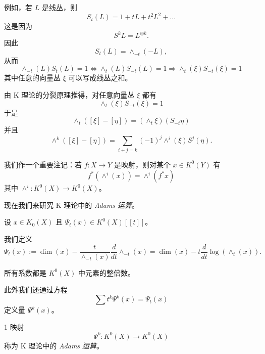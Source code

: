 例如，若 $L$ 是线丛，则
\[ S_t(L) = 1+tL+t^2L^2+\ldots \]
这是因为
\[ S^kL = L^{\otimes k}. \]
因此
\[ S_t(L) = \wedge_{-t}(-L), \]
从而
\[ \wedge_{-t}(L)S_t(L) = 1 \Leftrightarrow \wedge_t(L)S_{-t}(L) = 1\Rightarrow \wedge_t(\xi)S_{-t}(\xi) = 1 \]
其中任意的向量丛 $\xi$ 可以写成线丛之和。

由 K 理论的分裂原理推得，对任意向量丛 $\xi$ 都有
\[ \wedge_t(\xi)S_{-t}(\xi) = 1 \]
于是
\[ \wedge_t([\xi]-[\eta]) = (\wedge_t\xi)(S_{-t}\eta) \]
并且
\[ \wedge^k([\xi]-[\eta]) = \sum_{i+j=k}(-1)^j\wedge^i(\xi)S^j(\eta). \]

我们作一个重要注记：若 $f : X\to Y$ 是映射，则对某个 $x\in K^0(Y)$ 有
\[ f^*(\wedge^i(x)) = \wedge^i(f^*x) \]
其中 $\wedge^i : K^0(X)\to K^0(X)$。

现在我们来研究 K 理论中的 \emph{Adams 运算}。

设 $x\in K_0(X)$ 且 $\Psi_t(x)\in K^0(X)[[t]]$。

我们定义
\[ \Psi_t(x) := \dim(x)-\frac{t}{\wedge_{-t}(x)}\frac{d}{dt}\wedge_{-t}(x) = \dim(x)-t\frac{d}{dt}\log(\wedge_t(x)). \]

所有系数都是 $K^0(X)$ 中元素的整倍数。

此外我们还通过方程
\[ \sum t^k\Psi^k(x) = \Psi_t(x) \]
定义量 $\Psi^k(x)$。

\begin{defn}{1}
映射
\[ \Psi^k : K^0(X)\to K^0(X) \]
称为 K 理论中的 \emph{Adams 运算}。
\end{defn}

